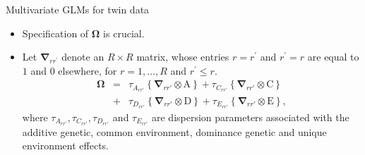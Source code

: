 \documentclass[
  ignorenonframetext,
  serif,
  professionalfont,
  usenames,
  dvipsnames,
  aspectratio = 169]{beamer}
\providecommand{\tightlist}{%
  \setlength{\itemsep}{0pt}\setlength{\parskip}{0pt}}
\renewcommand{\tightlist}{%
  \setlength{\itemsep}{0\baselineskip}
  \setlength{\parskip}{0.25\baselineskip}
}
\begin{document}
\begin{frame}{Multivariate GLMs for twin data}
\protect\hypertarget{multivariate-glms-for-twin-data-1}{}
\begin{itemize}
\tightlist
\item
  Specification of \(\boldsymbol{\Omega}\) is crucial.
\item
  Let \(\boldsymbol{\nabla}_{r r^{\prime}}\) denote an \(R \times R\)
  matrix, whose entries \(r = r^{\prime}\) and \(r^{\prime} = r\) are
  equal to \(1\) and \(0\) elsewhere, for \(r = 1, \ldots, R\) and
  \(r^{\prime} \leq r\). \begin{eqnarray}
  \label{multACDE}
  \boldsymbol{\Omega} &=& 
  \tau_{A_{rr\prime}} \left\{ \boldsymbol{\nabla}_{rr\prime} \otimes \mathrm{A} \right\} +  
  \tau_{C_{rr\prime}} \left\{ \boldsymbol{\nabla}_{rr\prime} \otimes \mathrm{C} \right\} \nonumber \\ &+& 
  \tau_{D_{rr\prime}} \left\{ \boldsymbol{\nabla}_{rr\prime} \otimes \mathrm{D} \right\} +  
  \tau_{E_{rr\prime}} \left\{ \boldsymbol{\nabla}_{rr\prime} \otimes \mathrm{E} \right\},
  \end{eqnarray} where
  \(\tau_{A_{rr\prime}}, \tau_{C_{rr\prime}}, \tau_{D_{rr\prime}}\) and
  \(\tau_{E_{rr\prime}}\) are dispersion parameters associated with the
  additive genetic, common environment, dominance genetic and unique
  environment effects.
\end{itemize}
\end{frame}
\end{document}
